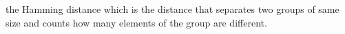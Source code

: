 the Hamming distance which is the distance that separates two groups of same size and counts how many elements of the group are different.